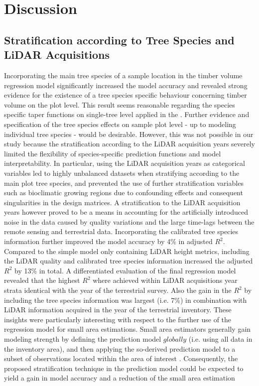 \section{Discussion}
\label{sec:Dis}

\subsection{Stratification according to Tree Species and LiDAR Acquisitions}
\label{sec:strat_dis}

Incorporating the main tree species of a sample location in the timber volume regression model significantly increased the model accuracy and revealed strong evidence for the existence of a tree species specific behaviour concerning timber volume on the plot level. This result seems reasonable regarding the species specific taper functions on single-tree level applied in the \bwi{} \citep{kublin2003, kublin2013}. Further evidence and specification of the tree species effects on sample plot level - up to modeling individual tree species - would be desirable. However, this was not possible in our study because the stratification according to the LiDAR acquisition years severely limited the flexibility of species-specific prediction functions and model interpretability. In particular, using the LiDAR acquisition years as categorical variables led to highly unbalanced datasets when stratifying according to the main plot tree species, and prevented the use of further stratification variables such as bioclimatic growing regions due to confounding effects and consequent singularities in the design matrices. A stratification to the LiDAR acquisition years however proved to be a means in accounting for the artificially introduced noise in the data caused by quality variations and the large time-lags between the remote sensing and terrestrial data. Incorporating the calibrated tree species information further improved the model accuracy by 4\% in adjusted $R^2$. Compared to the simple model only containing LiDAR height metrics, including the LiDAR quality and calibrated tree species information increased the adjusted $R^2$ by 13\% in total. A differentiated evaluation of the final regression model revealed that the highest $R^2$ where achieved within LiDAR acquisitions year strata identical with the year of the terrestrial survey. Also the gain in the $R^2$ by including the tree species information was largest (i.e. 7\%) in combination with LiDAR information acquired in the year of the terrestrial inventory. These insights were particularly interesting with respect to the further use of the regression model for small area estimations. Small area estimators generally gain modeling strength by defining the prediction model $globally$ (i.e. using all data in the inventory area), and then applying the so-derived prediction model to a subset of observations located within the area of interest \citep{mandallaz2016}. Consequently, the proposed stratification technique in the prediction model could be expected to yield a gain in model accuracy and a reduction of the small area estimation 